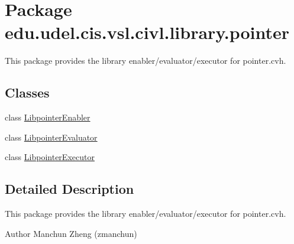 \hypertarget{namespaceedu_1_1udel_1_1cis_1_1vsl_1_1civl_1_1library_1_1pointer}{}\section{Package edu.\+udel.\+cis.\+vsl.\+civl.\+library.\+pointer}
\label{namespaceedu_1_1udel_1_1cis_1_1vsl_1_1civl_1_1library_1_1pointer}


This package provides the library enabler/evaluator/executor for pointer.\+cvh.  


\subsection*{Classes}
\begin{DoxyCompactItemize}
\item 
class \hyperlink{classedu_1_1udel_1_1cis_1_1vsl_1_1civl_1_1library_1_1pointer_1_1LibpointerEnabler}{Libpointer\+Enabler}
\item 
class \hyperlink{classedu_1_1udel_1_1cis_1_1vsl_1_1civl_1_1library_1_1pointer_1_1LibpointerEvaluator}{Libpointer\+Evaluator}
\item 
class \hyperlink{classedu_1_1udel_1_1cis_1_1vsl_1_1civl_1_1library_1_1pointer_1_1LibpointerExecutor}{Libpointer\+Executor}
\end{DoxyCompactItemize}


\subsection{Detailed Description}
This package provides the library enabler/evaluator/executor for pointer.\+cvh. 

\begin{DoxyAuthor}{Author}
Manchun Zheng (zmanchun) 
\end{DoxyAuthor}
